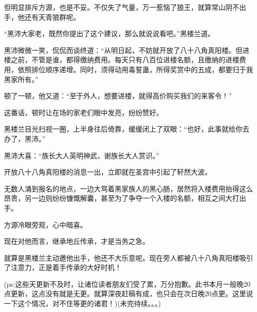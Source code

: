 \begin{this_body}
但明显排斥方源，也是不妥。不仅失了气量，万一惹恼了狼王，就算常山阴不出手，他还有天青狼群呢。

“黑沛大家老，既然你提出了这个建议，那么就说说看吧。”黑楼兰道。

黑沛微微一笑，侃侃而谈终道：“从明日起，不妨就开放了八十八角真阳楼。但进楼之前，不管是谁，都得缴纳费用。每天只有八百位进楼名额，且缴纳的进楼费用，依照排位顺序递增。同时，须得动用毒誓蛊，所得奖赏中的五成，都要归于我黑家所有。”

顿了一顿，他又道：“至于外人，想要进楼，就得高价购买我们的来客令！”

这番话，顿时让在场的家老们眼中发亮，纷纷赞好。

黑楼兰目光扫视一圈，上半身往后倚靠，缓缓闭上了双眼：“也好，此事就给你去办了，黑沛。”

黑沛大喜：“族长大人英明神武，谢族长大人赏识。”

开放八十八角真阳楼的消息一出，立即就在圣宫中引起了轩然大波。

无数人涌到报名的地点，一边大骂着黑家族人的黑心肠，居然将入楼费用抬得这么昂贵，另一边则纷纷慷慨解囊，甚至为了争夺一个入楼的名额，相互之间大打出手。

方源冷眼旁观，心中暗喜。

现在对他而言，继承地丘传承，才是当务之急。

就算是黑楼兰主动邀他出手，他还不大乐意呢。现在旁人都被八十八角真阳楼吸引了注意力，正是着手传承的大好时机！

(ps:这些天更新不及时，让诸位读者朋友们受了累，万分抱歉。此书本月一般晚20点更新，这点没有就是无更。就算深夜赶稿有成，也只会在次日晚20点更。这里说一下这个情况，对不住等更的诸君！)(未完待续。。。)

\end{this_body}

